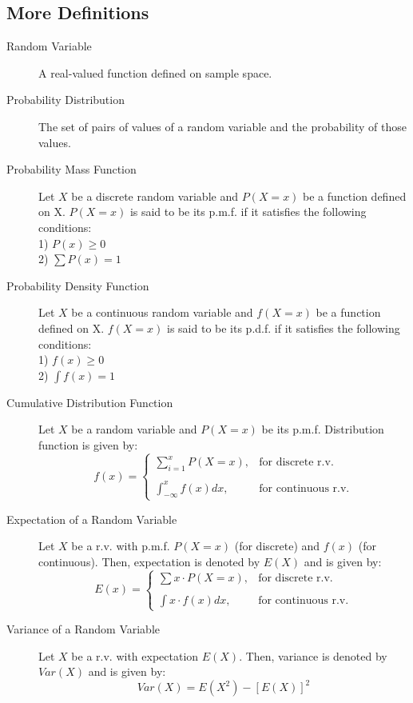 \documentclass[
10pt, %
a4paper, %
]{report}
\begin{document}
\subsection*{More Definitions}
\begin{description}
  \item[Random Variable]
    A real-valued function defined on sample space.
  \item[Probability Distribution]
    The set of pairs of values of a random variable and the probability of those values.
  \item[Probability Mass Function]
    Let \(X\) be a discrete random variable and \(P(X=x)\) be a function defined on X. \(P(X=x)\) is said to be its p.m.f. if it satisfies the following conditions: \\
    1) \(P(x)\geq 0\) \\
    2) \(\sum P(x) = 1\)
  \item[Probability Density Function]
    Let \(X\) be a continuous random variable and \(f(X=x)\) be a function defined on X. \(f(X=x)\) is said to be its p.d.f. if it satisfies the following conditions: \\
    1) \(f(x)\geq 0\) \\
    2) \(\int f(x) = 1\)
  \item[Cumulative Distribution Function]
    Let \(X\) be a random variable and \(P(X=x)\) be its p.m.f. Distribution function is given by:
    \[
    f(x)= 
        \begin{cases}
            \sum_{i=1}^x P(X=x),        & \text{for discrete r.v.} \\ \\
            \int_{-\infty}^x f(x)dx,    & \text{for continuous r.v.}
        \end{cases}
    \]
  \item[Expectation of a Random Variable]
    Let \(X\) be a r.v. with p.m.f. \(P(X=x)\) (for discrete) and \(f(x)\) (for continuous). Then, expectation is denoted by \(E(X)\) and is given by:
    \[
    E(x)= 
        \begin{cases}
            \sum x\cdot P(X=x),    & \text{for discrete r.v.} \\ \\
            \int x\cdot f(x)dx,    & \text{for continuous r.v.}
        \end{cases}
    \]
\item[Variance of a Random Variable]
    Let \(X\) be a r.v. with expectation \(E(X)\). Then, variance is denoted by \(Var(X)\) and is given by:
    \[
    Var(X) = E(X^2)-[E(X)]^2
    \]
\end{description}
\end{document}
